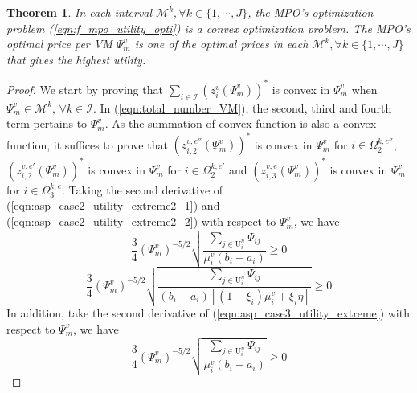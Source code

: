 \documentclass[conference]{IEEEtran}
\newtheorem{theorem}{Theorem}
\begin{document}
\begin{theorem} \label{thm:f_mpo_convex_optimization}
In each interval $\mathcal{M}^k, \forall k \in \{1, \cdots, J\}$, the MPO's optimization problem (\ref{eqn:f_mpo_utility_opti}) is a convex optimization problem. The MPO's optimal price per VM $\Psi_m^v$ is one of the optimal prices in each $\mathcal{M}^k, \forall k \in \{1, \cdots, J\}$ that gives the highest utility.
\end{theorem}
\begin{proof}
We start by proving that $\sum_{i \in \mathcal{I}} (z_{i}^v(\Psi_m^v))^*$ is convex in $\Psi_m^v$ when $\Psi_m^v \in \mathcal{M}^k,\, \forall k \in \mathcal{I}$. In (\ref{eqn:total_number_VM}), the second, third and fourth term pertains to $\Psi_m^v$. As the summation of convex function is also a convex function, it suffices to prove that $(z_{i,2}^{v,e''}(\Psi_m^v))^*$ is convex in $\Psi_m^v$ for $i \in \Omega_2^{k,e''}$, $(z_{i,2}^{v,e'}(\Psi_m^v))^*$ is convex in $\Psi_m^v$ for $i \in \Omega_2^{k,e'}$ and $(z_{i,3}^{v,e}(\Psi_m^v))^*$ is convex in $\Psi_m^v$ for $i \in \Omega_3^{k,e}$. Taking the second derivative of (\ref{eqn:asp_case2_utility_extreme2_1}) and (\ref{eqn:asp_case2_utility_extreme2_2}) with respect to $\Psi_m^v$, we have
\begin{equation}
\frac{3}{4}(\Psi_m^v)^{-5/2}\sqrt{\frac{\sum_{j \in \mathrm{U}_i^n}\Psi_{ij}}{\mu_i^v(b_i-a_i)}} \geq 0
\end{equation}
\begin{equation}
\frac{3}{4}(\Psi_m^v)^{-5/2}\sqrt{\frac{\sum_{j \in \mathrm{U}_i^n}\Psi_{ij}}{(b_i-a_i)[(1-\xi_i)\mu_i^v + \xi_i \eta]}} \geq 0
\end{equation}
In addition, take the second derivative of (\ref{eqn:asp_case3_utility_extreme}) with respect to $\Psi_m^v$, we have
\begin{equation}
\frac{3}{4}(\Psi_m^v)^{-5/2}\sqrt{\frac{\sum_{j \in \mathrm{U}_i^n}\Psi_{ij}}{\mu_i^v(b_i-a_i)}} \geq 0
\end{equation}


\end{proof}
\end{document}
